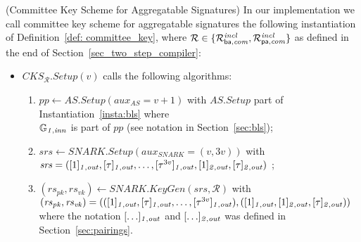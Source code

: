 \begin{construction}(Committee Key Scheme for Aggregatable Signatures)
\label{inst:cks} In our implementation we call committee key scheme for 
aggregatable signatures the following instantiation of Definition~\ref{def: committee_key}, where $\mathcal{R} \in \{\mathcal{R}^{\mathit{incl}}_{\mathsf{ba},\mathit{com}}, \mathcal{R}^{\mathit{incl}}_{\mathsf{pa},\mathit{com}}\}$ 
as defined in the end of Section~\ref{sec_two_step_compiler}:
\begin{itemize}
\item $\mathit{CKS_{\mathcal{R}}.Setup}(v)$ calls the following algorithms: 
\begin{enumerate}
\item $\mathit{pp} \leftarrow \mathit{AS.Setup}(\mathit{aux_{\mathit{AS}}}= v+1)$ with  $\mathit{AS.Setup}$ part of Instantiation~\ref{insta:bls} where \\
$\mathbb{G}_{\mathit{1,inn}}$ is part of $\mathit{pp}$ (see notation in Section~\ref{sec:bls});
\item $\mathit{srs} \leftarrow \mathit{SNARK.Setup}(\mathit{aux_{\mathit{SNARK}}} = (v, 3v))$ with \\
$\mathit{srs}=([1]_{\mathit{1,out}}, [\tau]_{\mathit{1,out}}, \ldots, [\tau^{3v}]_{\mathit{1,out}}, [1]_{\mathit{2,out}}, [\tau]_{\mathit{2,out}})$ ;
\item $(\mathit{rs}_{\mathit{pk}}, \mathit{rs}_{\mathit{vk}}) \leftarrow \mathit{SNARK.KeyGen}(\mathit{srs}, \mathcal{R})$ with \\ 
$(\mathit{rs}_{\mathit{pk}}, \mathit{rs}_{\mathit{vk}}) =  (([1]_{\mathit{1,out}}, [\tau]_{\mathit{1,out}}, \ldots, [\tau^{3v}]_{\mathit{1,out}}),([1]_{\mathit{1,out}}, [1]_{\mathit{2,out}}, [\tau]_{\mathit{2,out}}))$ \\
where %
the notation $[\ldots]_{\mathit{1,out}}$ and $[\ldots]_{\mathit{2,out}}$ was defined in Section~\ref{sec:pairings}.
\end{enumerate}


\end{itemize}
\end{construction}
